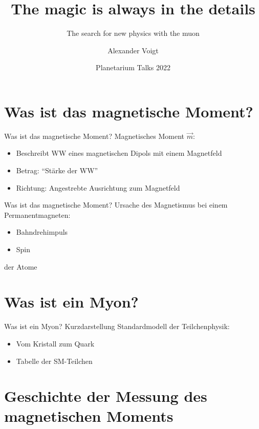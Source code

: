 \documentclass[12pt]{beamer}
\title{The magic is always in the details}
\subtitle{The search for new physics with the muon}
\author[Voigt]{Alexander Voigt}
\institute[HS Flensburg]{Hochschule Flensburg}
\date{Planetarium Talks 2022}
\begin{document}

\begin{frame}
  \titlepage
\end{frame}


\section{Was ist das magnetische Moment?}

\begin{frame}{Was ist das magnetische Moment?}
  Magnetisches Moment $\vec{m}$:
  \begin{itemize}
  \item Beschreibt WW eines magnetischen Dipols mit einem Magnetfeld
  \item Betrag: "`Stärke der WW"'
  \item Richtung: Angestrebte Ausrichtung zum Magnetfeld
  \end{itemize}
\end{frame}

\begin{frame}{Was ist das magnetische Moment?}
  Ursache des Magnetismus bei einem Permanentmagneten:
  \begin{itemize}
  \item Bahndrehimpuls
  \item Spin
  \end{itemize}
  der Atome
\end{frame}


\section{Was ist ein Myon?}

\begin{frame}{Was ist ein Myon?}
  Kurzdarstellung Standardmodell der Teilchenphysik:
  \begin{itemize}
  \item Vom Kristall zum Quark
  \item Tabelle der SM-Teilchen
  \end{itemize}
\end{frame}


\section{Geschichte der Messung des magnetischen Moments}
\end{document}
